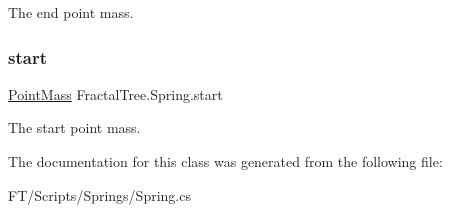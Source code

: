 The end point mass. 

\mbox{\label{class_fractal_tree_1_1_spring_a4008f4f4f6404df50062047b0afa2ec8}} 
\subsubsection{\texorpdfstring{start}{start}}
{\footnotesize\ttfamily \hyperlink{class_fractal_tree_1_1_point_mass}{Point\+Mass} Fractal\+Tree.\+Spring.\+start}



The start point mass. 



The documentation for this class was generated from the following file\+:\begin{DoxyCompactItemize}
\item 
F\+T/\+Scripts/\+Springs/Spring.\+cs\end{DoxyCompactItemize}
